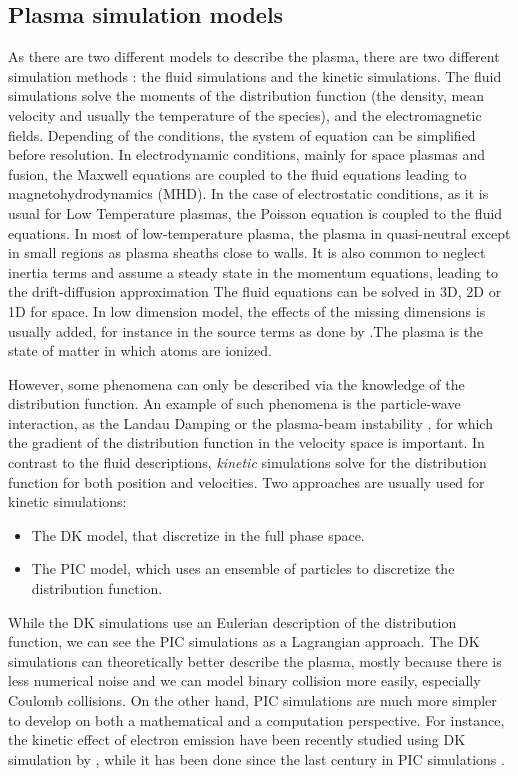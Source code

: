 \subsection*{Plasma simulation models} \label{subsec-simulations}
As there are two different models to describe the plasma, there are two different simulation methods \string: the fluid simulations and the kinetic simulations.
The fluid simulations solve the moments of the distribution function (the density, mean velocity and usually the temperature of the species), and the electromagnetic fields.
Depending of the conditions, the system of equation can be simplified before resolution.
In electrodynamic conditions, mainly for space plasmas and fusion, the Maxwell equations are coupled to the fluid equations leading to magnetohydrodynamics (MHD).
In the case of electrostatic conditions, as it is usual for Low Temperature plasmas, the Poisson equation is coupled to the fluid equations.
In most of low-temperature plasma, the plasma in quasi-neutral except in small regions as plasma sheaths close to walls.
It is also common to neglect inertia terms and assume a steady state in the momentum equations, leading to the drift-diffusion approximation
The fluid equations can be solved in \ac{3D}, \ac{2D} or \ac{1D} for space.
In low dimension model, the effects of the missing dimensions is usually added, for instance in the source terms as done by \citet{barral2003a}.The plasma is the state of matter in which atoms are ionized.


\vspace{1em}
However, some phenomena can only be described via the knowledge of the distribution function.
An example of such phenomena is the particle-wave interaction, as the Landau Damping \citep{landau1945,malmberg1964} or the plasma-beam instability \citep{filippychev1990}, for which the gradient of the distribution function in the velocity space is important.
In contrast to the fluid descriptions, \emph{kinetic} simulations solve for the distribution function for both position and velocities.
Two approaches are usually used for kinetic simulations\string:
\begin{itemize}
  \item The \ac{DK} model, that discretize  in the full phase space.
  \item The \ac{PIC} model, which uses an ensemble of particles to discretize the distribution function.
\end{itemize} 
While the \ac{DK} simulations use an Eulerian description of the distribution function, we can see the \ac{PIC} simulations as a Lagrangian approach.
The \ac{DK} simulations can theoretically better describe the plasma, mostly because there is less numerical noise and we can model binary collision more easily, especially Coulomb collisions.
On the other hand, \ac{PIC} simulations are much more simpler to develop on both a mathematical and a computation perspective.
For instance, the kinetic effect of electron emission have been recently studied using \ac{DK} simulation by \citet{cagas2019}, while it has been done since the last century in \ac{PIC} simulations \citep{boswell1988}.


